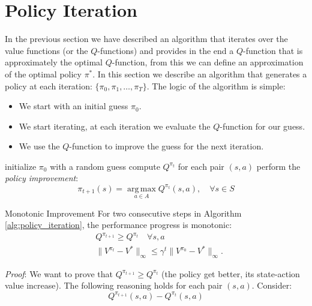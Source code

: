 \documentclass[10pt, a4paper]{report}
\begin{document}
\section{Policy Iteration}
In the previous section we have described an algorithm that iterates over the value functions (or the $Q$-functions) and provides in the end a $Q$-function that is approximately the optimal $Q$-function, from this we can define an approximation of the optimal policy $\pi^*$. In this section we describe an algorithm that generates a policy at each iteration: $\{\pi_0,\pi_1,\dots,\pi_T\}$. The logic of the algorithm is simple: \begin{itemize}
    \item We start with an initial guess $\pi_0$.
    \item We start iterating, at each iteration we evaluate the $Q$-function for our guess.
    \item We use the $Q$-function to improve the guess for the next iteration.
\end{itemize}
\begin{algorithm}[H]
\caption{Policy Iteration}\label{alg:policy_iteration}
\begin{algorithmic}[1]
\State initialize $\pi_0$ with a random guess
\Do
\State compute $Q^{\pi_t}$ for each pair $(s,a)$
\State perform the \textit{policy improvement}:\begin{equation}
    \pi_{t+1}(s)=\operatorname*{arg\,max}_{a\in A}Q^{\pi_t}(s,a),\quad \forall s\in S 
\end{equation}
\end{algorithmic}
\end{algorithm}
\begin{boxproposition}{Monotonic Improvement}{}
    For two consecutive steps in Algorithm \ref{alg:policy_iteration}, the performance progress is monotonic:
    \begin{align}
    &Q^{\pi_{t+1}}\ge Q^{\pi_t} \quad \forall s,a \\ 
    &\|V^{\pi_t}-V^*\|_\infty\le\gamma^t\|V^{\pi_0}-V^*\|_\infty.
\end{align}
\end{boxproposition}
\noindent\textit{Proof}: We want to prove that $Q^{\pi_{t+1}}\ge Q^{\pi_t}$ (the policy get better, its state-action value increase). The following reasoning holds for each pair $(s,a)$. Consider:\begin{equation}
    Q^{\pi_{t+1}}(s,a)- Q^{\pi_t}(s,a)
\end{equation}
\end{document}
